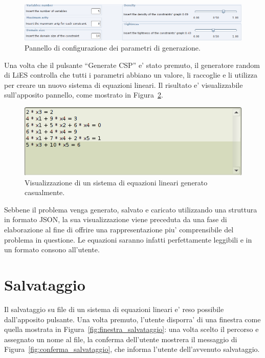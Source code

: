 \documentclass{article}
\begin{document}
\begin{figure}[htp!]
	\centering
	\includegraphics[scale=.4]{ug-images/parameters.png}
	\caption{Pannello di configurazione dei parametri di generazione.}
	\label{fig:parametri}
\end{figure}

Una volta che il pulsante ``Generate CSP'' e' stato premuto, il generatore random di LiES controlla che tutti i parametri abbiano un valore, li raccoglie e li utilizza per creare un nuovo sistema di equazioni lineari. Il risultato e' visualizzabile sull'apposito pannello, come mostrato in Figura~\ref{fig:visualizzazione}.

\begin{figure}[htp!]
	\centering
	\includegraphics[scale=.5]{ug-images/system.png}
	\caption{Visualizzazione di un sistema di equazioni lineari generato casualmente.}
	\label{fig:visualizzazione}
\end{figure}

Sebbene il problema venga generato, salvato e caricato utilizzando una struttura in formato JSON, la sua visualizzazione viene preceduta da una fase di elaborazione al fine di offrire una rappresentazione piu' comprensibile del problema in questione. Le equazioni saranno infatti perfettamente leggibili e in un formato consono all'utente.


\section{Salvataggio}
\label{sec:salvataggio}

Il salvataggio su file di un sistema di equazioni lineari e' reso possibile dall'apposito pulsante. Una volta premuto, l'utente disporra' di una finestra come quella mostrata in Figura~\ref{fig:finestra_salvataggio}: una volta scelto il percorso e assegnato un nome al file, la conferma dell'utente mostrera il messaggio di Figura~\ref{fig:conferma_salvataggio}, che informa l'utente dell'avvenuto salvataggio.
\end{document}
